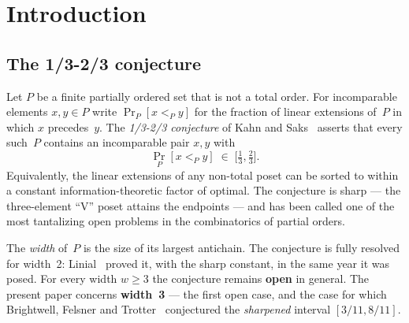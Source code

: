 \documentclass[11pt,reqno]{amsart}
\theoremstyle{plain}
\theoremstyle{definition}
\begin{document}
\tableofcontents

\section{Introduction}\label{sec:intro}

\subsection{The 1/3-2/3 conjecture}
Let $P$ be a finite partially ordered set that is not a total order. For
incomparable elements $x,y\in P$ write $\Pr_P[x<_Py]$ for the fraction
of linear extensions of~$P$ in which $x$ precedes~$y$. The
\emph{1/3-2/3 conjecture} of Kahn and Saks~\cite{KahnSaks1984} asserts
that every such~$P$ contains an incomparable pair $x,y$ with
\[
  \Pr_P[x<_Py]\;\in\;\bigl[\tfrac13,\tfrac23\bigr].
\]
Equivalently, the linear extensions of any non-total poset can be sorted
to within a constant information-theoretic factor of optimal. The
conjecture is sharp --- the three-element ``V'' poset attains the
endpoints --- and has been called one of the most tantalizing open
problems in the combinatorics of partial orders.

The \emph{width} of~$P$ is the size of its largest antichain. The
conjecture is fully resolved for width~2: Linial~\cite{Linial1984}
proved it, with the sharp constant, in the same year it was posed. For
every width $w\ge3$ the conjecture remains \textbf{open} in general. The
present paper concerns \textbf{width~3} --- the first open case, and the
case for which Brightwell, Felsner and Trotter~\cite{BFT1995} conjectured
the \emph{sharpened} interval $[3/11,8/11]$.
\end{document}
